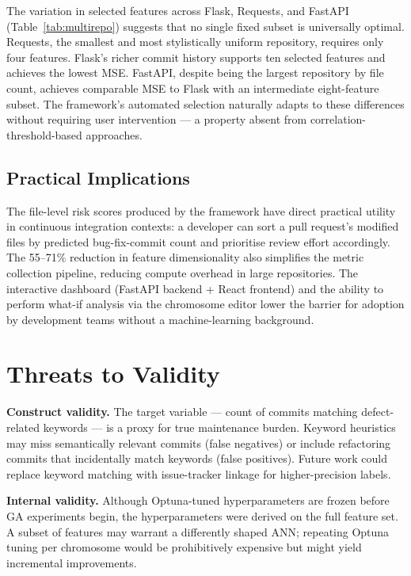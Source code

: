 \documentclass[11pt,a4paper]{article}
\begin{document}
The variation in selected features across Flask, Requests, and FastAPI
(Table~\ref{tab:multirepo}) suggests that no single fixed subset is universally
optimal. Requests, the smallest and most stylistically uniform repository,
requires only four features. Flask's richer commit history supports ten selected
features and achieves the lowest MSE. FastAPI, despite being the largest
repository by file count, achieves comparable MSE to Flask with an intermediate
eight-feature subset. The framework's automated selection naturally adapts to
these differences without requiring user intervention --- a property absent from
correlation-threshold-based approaches.

\subsection{Practical Implications}

The file-level risk scores produced by the framework have direct practical
utility in continuous integration contexts: a developer can sort a pull request's
modified files by predicted bug-fix-commit count and prioritise review effort
accordingly. The 55--71\% reduction in feature dimensionality also simplifies
the metric collection pipeline, reducing compute overhead in large repositories.
The interactive dashboard (FastAPI backend + React frontend) and the ability
to perform what-if analysis via the chromosome editor lower the barrier for
adoption by development teams without a machine-learning background.

\section{Threats to Validity}
\label{sec:threats}

\textbf{Construct validity.} The target variable --- count of commits matching
defect-related keywords --- is a proxy for true maintenance burden. Keyword
heuristics may miss semantically relevant commits (false negatives) or
include refactoring commits that incidentally match keywords (false positives).
Future work could replace keyword matching with issue-tracker linkage for
higher-precision labels.

\textbf{Internal validity.} Although Optuna-tuned hyperparameters are frozen
before GA experiments begin, the hyperparameters were derived on the full
feature set. A subset of features may warrant a differently shaped ANN;
repeating Optuna tuning per chromosome would be prohibitively expensive but
might yield incremental improvements.
\end{document}

